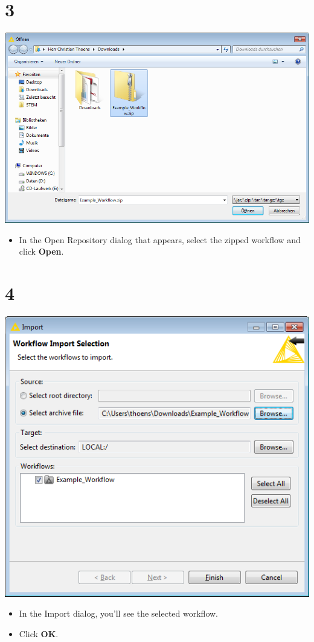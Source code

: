 \documentclass{beamer}
\begin{document}
\section{3}
\begin{frame}
	\begin{center}
  		\includegraphics[height=0.6\textheight]{3.png}
	\end{center}
	\begin{itemize}
		\item In the Open Repository dialog that appears, select the zipped workflow and click \textbf{Open}.
	\end{itemize}
\end{frame}

\section{4}
\begin{frame}
	\begin{center}
  		\includegraphics[height=0.7\textwidth]{4.png}
	\end{center}
	\begin{itemize}
		\item In the Import dialog, you'll see the selected workflow.
		\item Click \textbf{OK}.
	\end{itemize}
\end{frame}
\end{document}
